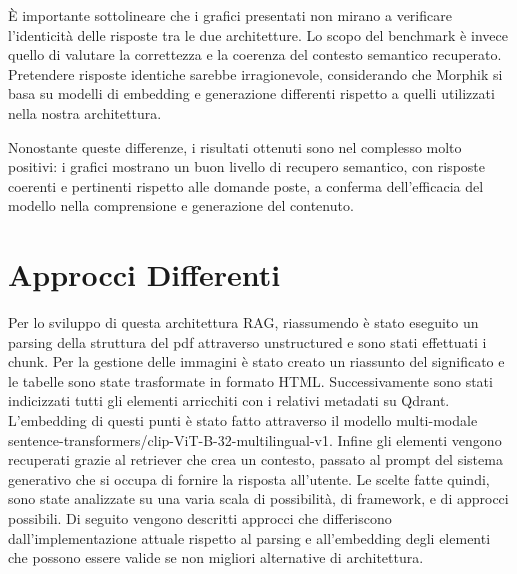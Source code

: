 È importante sottolineare che i grafici presentati non mirano a verificare l’identicità delle risposte tra le due architetture. Lo scopo del benchmark è invece quello di valutare la correttezza e la coerenza del contesto semantico recuperato. Pretendere risposte identiche sarebbe irragionevole, considerando che Morphik si basa su modelli di embedding e generazione differenti rispetto a quelli utilizzati nella nostra architettura.

Nonostante queste differenze, i risultati ottenuti sono nel complesso molto positivi: i grafici mostrano un buon livello di recupero semantico, con risposte coerenti e pertinenti rispetto alle domande poste, a conferma dell'efficacia del modello nella comprensione e generazione del contenuto.

\section{Approcci Differenti}
Per lo sviluppo di questa architettura RAG, riassumendo è stato eseguito un parsing della struttura del pdf attraverso unstructured e sono stati effettuati i chunk. Per la gestione delle immagini è stato creato un riassunto del significato e le tabelle sono state trasformate in formato HTML. Successivamente sono stati indicizzati tutti gli elementi arricchiti con i relativi metadati su Qdrant. L'embedding di questi punti è stato fatto attraverso il modello multi-modale  sentence-transformers/clip-ViT-B-32-multilingual-v1. Infine gli elementi vengono recuperati grazie al retriever che crea un contesto, passato al prompt del sistema generativo che si occupa di fornire la risposta all'utente. Le scelte fatte quindi, sono state analizzate su una varia scala di possibilità, di framework, e di approcci possibili. Di seguito vengono descritti approcci che differiscono dall'implementazione attuale rispetto al parsing e all'embedding degli elementi che possono essere valide se non migliori alternative di architettura.
